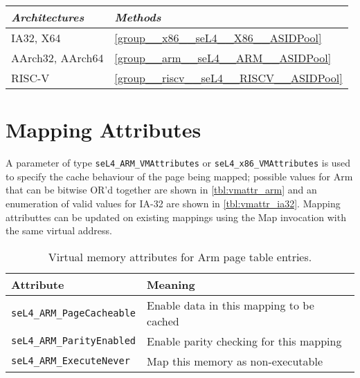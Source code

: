 \begin{tabularx}{\textwidth}{Xl} \toprule
\emph{Architectures} & \emph{Methods} \\ \midrule
IA32, X64            & \autoref{group__x86__seL4__X86__ASIDPool} \\
AArch32, AArch64     & \autoref{group__arm__seL4__ARM__ASIDPool} \\
RISC-V               & \autoref{group__riscv__seL4__RISCV__ASIDPool} \\
\bottomrule
\end{tabularx}

\section{Mapping Attributes}
A parameter of type \texttt{seL4\_ARM\_VMAttributes} or
\texttt{seL4\_x86\_VMAttributes} is used to specify the cache behaviour of the
page being mapped; possible values for Arm that can be bitwise OR'd together are
shown in \autoref{tbl:vmattr_arm} \ifxeightsix and an enumeration of valid values
for IA-32 are shown in \autoref{tbl:vmattr_ia32}\fi. Mapping attributtes can be updated on existing mappings using the Map invocation with the same virtual address.

\begin{table}[htb]
  \begin{center}
    \begin{tabularx}{\textwidth}{p{}X}
      \toprule
      Attribute & Meaning \\
      \midrule
      \texttt{seL4\_ARM\_PageCacheable} & Enable data in this mapping
      to be cached \\
      \texttt{seL4\_ARM\_ParityEnabled} & Enable parity checking for
      this mapping\\
      \texttt{seL4\_ARM\_ExecuteNever} & Map this memory as non-executable \\
      \bottomrule
    \end{tabularx}
    \caption{\label{tbl:vmattr_arm} Virtual memory attributes for Arm page
      table entries.}
  \end{center}
\end{table}

